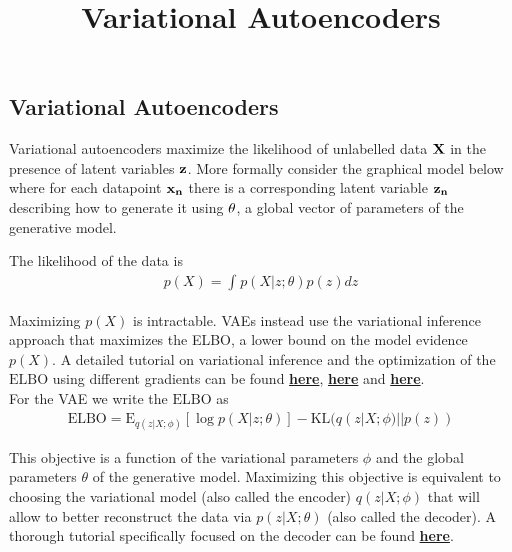 \documentclass{article}
\title{Variational Autoencoders}
\begin{document}
\subsection*{Variational Autoencoders}

Variational autoencoders maximize the likelihood of unlabelled data $\bf{X}$ in the presence of latent variables $\bf{z}$. More formally consider the graphical model below where for each datapoint $\bf{x}_n$ there is a corresponding latent variable $\bf{z}_n$ describing how to generate it using $\bf{\theta}$, a global vector of parameters of the generative model. \\

\begin{figure}[ht]
      \centering
    \end{figure}
    
\noindent The likelihood of the data is
\begin{align*}
	p(X) = \int_{}^{} p(X | z; \theta) p(z) dz
\end{align*}

\noindent Maximizing $p(X)$ is intractable. VAEs instead use the variational inference approach that maximizes the ELBO, a lower bound on the model evidence $p(X)$. A detailed tutorial on variational inference and the optimization of the $\mathrm{ELBO}$ using different gradients can be found 
\href{http://edwardlib.org/tut_variational_inference}{\bf{here}}, \href{http://edwardlib.org/tut_KLqp_score}{\bf{here}} and \href{http://edwardlib.org/tut_KLqp_reparam}{\bf{here}}.\\

\noindent For the VAE we write the $\mathrm{ELBO}$ as
\begin{align*}
\mathrm{ELBO} = 
	\mathrm{E}_{q(z | X; \phi)} [\log p(X | z; \theta)] - \mathrm{KL}(q(z | X; \phi) || p(z))
\end{align*}

\noindent This objective is a function of the variational parameters $\phi$ and the global parameters $\theta$ of the generative model. Maximizing this objective is equivalent to choosing the variational model (also called the encoder) $q(z | X; \phi)$ that will allow to better reconstruct the data via $p(z | X; \theta)$ (also called the decoder). A thorough tutorial specifically focused on the decoder can be found \href{http://edwardlib.org/tut_decoder}
{\textbf{here}}.\\
\end{document}
